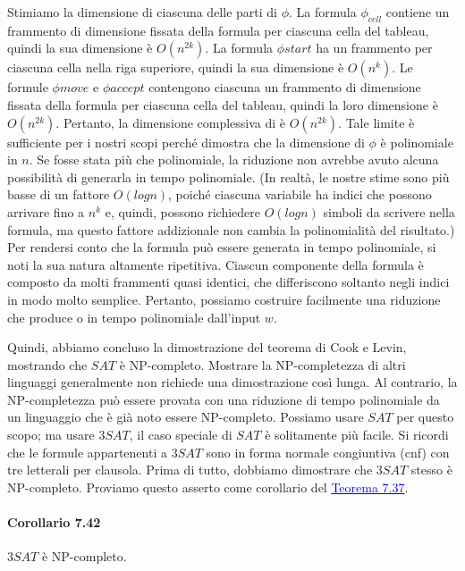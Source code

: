 \documentclass{article}
\begin{document}
Stimiamo la dimensione di ciascuna delle parti di $\phi$.
La formula $\phi_{cell}$ contiene un frammento di dimensione fissata della formula per ciascuna cella del tableau, quindi la sua dimensione è $O(n^{2k})$. 
La formula $\phi{start}$ ha un frammento per ciascuna cella nella riga superiore, quindi la sua dimensione è $O(n^{k})$. 
Le formule $\phi{move}$ e $\phi{accept}$ contengono ciascuna un frammento di dimensione fissata della formula per ciascuna cella del tableau, quindi la loro dimensione è $O(n^{2k})$.
Pertanto, la dimensione complessiva di è $O(n^{2k})$.
Tale limite è sufficiente per i nostri scopi perché dimostra che la dimensione di $\phi$ è polinomiale in $n$.
Se fosse stata più che polinomiale, la riduzione non avrebbe avuto alcuna possibilità di generarla in tempo polinomiale.
(In realtà, le nostre stime sono più basse di un fattore $O(logn)$, poiché ciascuna variabile ha indici che possono arrivare fino a $n^k$ e, quindi, possono richiedere $O(logn)$ simboli da scrivere nella formula, ma questo fattore addizionale non cambia la polinomialità del risultato.)
Per rendersi conto che la formula può essere generata in tempo polinomiale, si noti la sua natura altamente ripetitiva.
Ciascun componente della formula è composto da molti frammenti quasi identici, che differiscono soltanto negli indici in modo molto semplice. 
Pertanto, possiamo costruire facilmente una riduzione che produce o in tempo polinomiale dall'input $w$.

\text{}
\newline
Quindi, abbiamo concluso la dimostrazione del teorema di Cook e Levin, mostrando che $SAT$ è NP-completo.
Mostrare la NP-completezza di altri linguaggi generalmente non richiede una dimostrazione così lunga. 
Al contrario, la NP-completezza può essere provata con una riduzione di tempo polinomiale da un linguaggio che è già noto essere NP-completo. 
Possiamo usare $SAT$ per questo scopo; ma usare $3SAT$, il caso speciale di $SAT$ è solitamente più facile. 
Si ricordi che le formule appartenenti a $3SAT$ sono in forma normale congiuntiva (cnf) con tre letterali per clausola. 
Prima di tutto, dobbiamo dimostrare che $3SAT$ stesso è NP-completo. 
Proviamo questo asserto come corollario del \hyperref[teorema-7.37]{\textcolor{blue}{Teorema 7.37}}.

\text{}
\newline
\paragraph{Corollario 7.42}
\label{corollario-7.42}
\vspace{1em}
\text{}
\newline
$3SAT$ è NP-completo.
\end{document}
